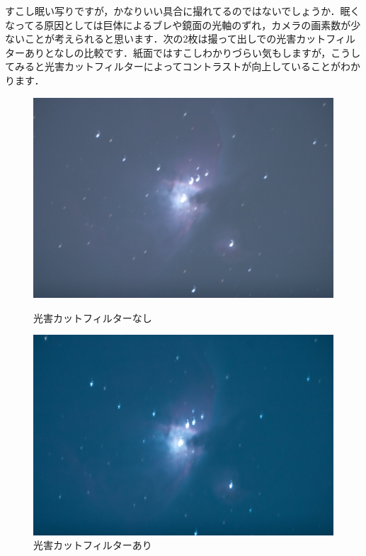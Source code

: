 \documentclass[supernova_2023]{subfiles}
\begin{document}
すこし眠い写りですが，かなりいい具合に撮れてるのではないでしょうか．眠くなってる原因としては巨体によるブレや鏡面の光軸のずれ，カメラの画素数が少ないことが考えられると思います．次の2枚は撮って出しでの光害カットフィルターありとなしの比較です．紙面ではすこしわかりづらい気もしますが，こうしてみると光害カットフィルターによってコントラストが向上していることがわかります．
\begin{figure}[H]
  \centering
  \begin{minipage}{0.3\columnwidth}
    \centering
    \includegraphics[width=\columnwidth, angle=180]{figures/Yosuke/orion_ngt18_non.jpg}
    \caption{光害カットフィルターなし}
    \label{fig:orion_ngt18_no}
  \end{minipage}
  \begin{minipage}{0.3\columnwidth}
    \centering
    \includegraphics[width=\columnwidth, angle=180]{figures/Yosuke/orion_ngt18_cut.jpg}
    \caption{光害カットフィルターあり}
    \label{fig:orion_ngt18_cut}
  \end{minipage}
\end{figure}
\end{document}
